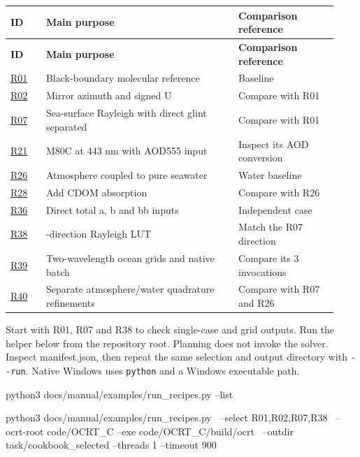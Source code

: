 {\TableFont
\begin{longtable}{@{}>{\raggedright\arraybackslash}p{0.10\linewidth}>{\raggedright\arraybackslash}p{0.54\linewidth}>{\raggedright\arraybackslash}p{0.29\linewidth}@{}}
\toprule
\textbf{ID} & \textbf{Main purpose} & \textbf{Comparison reference} \\
\midrule
\endfirsthead
\toprule
\textbf{ID} & \textbf{Main purpose} & \textbf{Comparison reference} \\
\midrule
\endhead
\bottomrule
\endfoot
\hyperref[recipe:R01]{R01} & Black-boundary molecular reference & Baseline \\
\hyperref[recipe:R02]{R02} & Mirror azimuth and signed U & Compare with R01 \\
\hyperref[recipe:R07]{R07} & Sea-surface Rayleigh with direct glint separated & Compare with R01 \\
\hyperref[recipe:R21]{R21} & M80C at 443 nm with AOD555 input & Inspect its AOD conversion \\
\hyperref[recipe:R26]{R26} & Atmosphere coupled to pure seawater & Water baseline \\
\hyperref[recipe:R28]{R28} & Add CDOM absorption & Compare with R26 \\
\hyperref[recipe:R36]{R36} & Direct total a, b and bb inputs & Independent case \\
\hyperref[recipe:R38]{R38} & 12-direction Rayleigh LUT & Match the R07 direction \\
\hyperref[recipe:R39]{R39} & Two-wavelength ocean grids and native batch & Compare its 3 invocations \\
\hyperref[recipe:R40]{R40} & Separate atmosphere/water quadrature refinements & Compare with R07 and R26 \\
\end{longtable}
}

Start with R01, R07 and R38 to check single-case and grid outputs. Run the helper below from the repository root. Planning does not invoke the solver. Inspect manifest.json, then repeat the same selection and output directory with \texttt{-\allowbreak{}-\allowbreak{}run}. Native Windows uses \texttt{python} and a Windows executable path.

\noindent\begin{minipage}{\linewidth}
\begin{ManualCode}

python3 docs/manual/examples/run_recipes.py --list

python3 docs/manual/examples/run_recipes.py \
  --select R01,R02,R07,R38 \
  --ocrt-root code/OCRT_C --exe code/OCRT_C/build/ocrt \
  --outdir task/cookbook_selected --threads 1 --timeout 900

\end{ManualCode}
\end{minipage}\par

